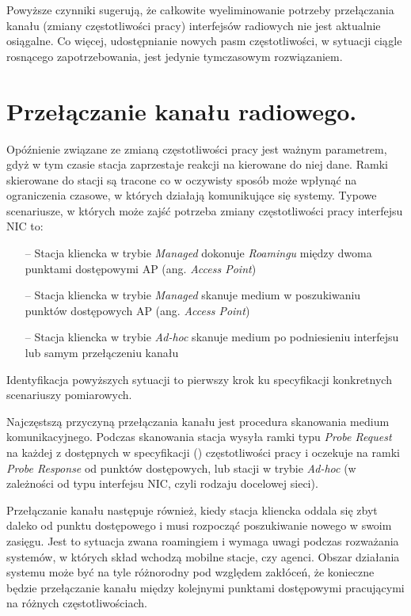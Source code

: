 Powyższe czynniki sugerują, że całkowite wyeliminowanie potrzeby przełączania kanału (zmiany częstotliwości pracy) interfejsów radiowych nie jest aktualnie osiągalne. Co więcej, udostępnianie nowych pasm częstotliwości, w sytuacji ciągle rosnącego zapotrzebowania, jest jedynie tymczasowym rozwiązaniem.  


\section{Przełączanie kanału radiowego.}
Opóźnienie związane ze zmianą częstotliwości pracy jest ważnym parametrem, gdyż w tym czasie stacja zaprzestaje reakcji na kierowane do niej dane. Ramki skierowane do stacji są tracone co w oczywisty sposób może wpłynąć na ograniczenia czasowe, w których działają komunikujące się systemy. 
Typowe scenariusze, w których może zajść potrzeba zmiany częstotliwości pracy interfejsu NIC to:
\begin{itemize}
\item[--] Stacja kliencka w trybie \emph{Managed} dokonuje \emph{Roamingu} między dwoma punktami dostępowymi AP (ang. \emph{Access Point}) 
\item[--] Stacja kliencka w trybie \emph{Managed} skanuje medium w poszukiwaniu punktów dostępowych AP (ang. \emph{Access Point})
\item[--] Stacja kliencka w trybie \emph{Ad-hoc} skanuje medium po podniesieniu interfejsu lub samym przełączeniu kanału 
\end{itemize}
Identyfikacja powyższych sytuacji to pierwszy krok ku specyfikacji konkretnych scenariuszy pomiarowych. 

Najczęstszą przyczyną przełączania kanału jest procedura skanowania medium komunikacyjnego. Podczas skanowania stacja wysyła ramki typu \emph{Probe Request} na każdej z dostępnych w specyfikacji (\cite{std:IEEE80211}) częstotliwości pracy i oczekuje na ramki \emph{Probe Response} od punktów dostępowych, lub stacji w trybie \emph{Ad-hoc} (w zależności od typu interfejsu NIC, czyli rodzaju docelowej sieci).

Przełączanie kanału następuje również, kiedy stacja kliencka oddala się zbyt daleko od punktu dostępowego i musi rozpocząć poszukiwanie nowego w swoim zasięgu. Jest to sytuacja zwana roamingiem i wymaga uwagi podczas rozważania systemów, w których skład wchodzą mobilne stacje, czy agenci. Obszar działania systemu może być na tyle różnorodny pod względem zakłóceń, że konieczne będzie przełączanie kanału między kolejnymi punktami dostępowymi pracującymi na różnych częstotliwościach.

